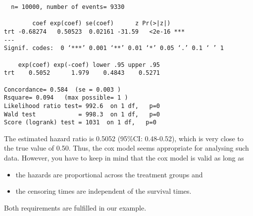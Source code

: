 \begin{enumerate}[(a)]
\begin{footnotesize}
\begin{verbatim}
  n= 10000, number of events= 9330 

        coef exp(coef) se(coef)      z Pr(>|z|)    
trt -0.68274   0.50523  0.02161 -31.59   <2e-16 ***
---
Signif. codes:  0 ‘***’ 0.001 ‘**’ 0.01 ‘*’ 0.05 ‘.’ 0.1 ‘ ’ 1

    exp(coef) exp(-coef) lower .95 upper .95
trt    0.5052      1.979    0.4843    0.5271

Concordance= 0.584  (se = 0.003 )
Rsquare= 0.094   (max possible= 1 )
Likelihood ratio test= 992.6  on 1 df,   p=0
Wald test            = 998.3  on 1 df,   p=0
Score (logrank) test = 1031  on 1 df,   p=0
\end{verbatim}
\end{footnotesize}
The estimated hazard ratio is 0.5052 (95\%CI: 0.48-0.52), which is very close to the true value of 0.50. Thus, the cox model seems appropriate for analysing such data. However, you have to keep in mind that the cox model is valid as long as
\begin{itemize}
\item the hazards are proportional across the treatment groups and
\item the censoring times are independent of the survival times.
\end{itemize}
Both requirements are fulfilled in our example.
\end{enumerate}























